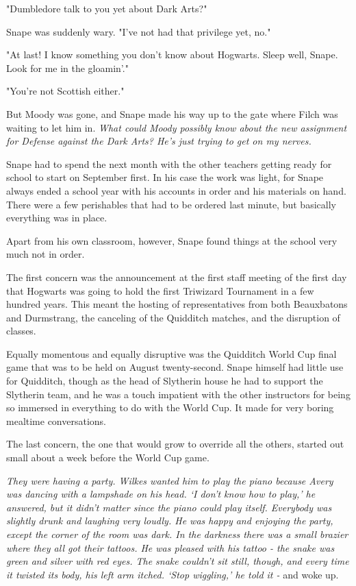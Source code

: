 "Dumbledore talk to you yet about Dark Arts?"

Snape was suddenly wary. "I've not had that privilege yet, no."

"At last! I know something you don't know about Hogwarts. Sleep well, Snape. Look for me in the gloamin'."

"You're not Scottish either."

But Moody was gone, and Snape made his way up to the gate where Filch was waiting to let him in. \emph{What could Moody possibly know about the new assignment for Defense against the Dark Arts? He's just trying to get on my nerves.}

\sbreak

Snape had to spend the next month with the other teachers getting ready for school to start on September first. In his case the work was light, for Snape always ended a school year with his accounts in order and his materials on hand. There were a few perishables that had to be ordered last minute, but basically everything was in place.

Apart from his own classroom, however, Snape found things at the school very much not in order.

The first concern was the announcement at the first staff meeting of the first day that Hogwarts was going to hold the first Triwizard Tournament in a few hundred years. This meant the hosting of representatives from both Beauxbatons and Durmstrang, the canceling of the Quidditch matches, and the disruption of classes.

Equally momentous and equally disruptive was the Quidditch World Cup final game that was to be held on August twenty-second. Snape himself had little use for Quidditch, though as the head of Slytherin house he had to support the Slytherin team, and he was a touch impatient with the other instructors for being so immersed in everything to do with the World Cup. It made for very boring mealtime conversations.

The last concern, the one that would grow to override all the others, started out small about a week before the World Cup game.

\sbreak

\emph{They were having a party. Wilkes wanted him to play the piano because Avery was dancing with a lampshade on his head. `I don't know how to play,' he answered, but it didn't matter since the piano could play itself. Everybody was slightly drunk and laughing very loudly. He was happy and enjoying the party, except the corner of the room was dark. In the darkness there was a small brazier where they all got their tattoos. He was pleased with his tattoo - the snake was green and silver with red eyes. The snake couldn't sit still, though, and every time it twisted its body, his left arm itched. `Stop wiggling,' he told it - }and woke up.

